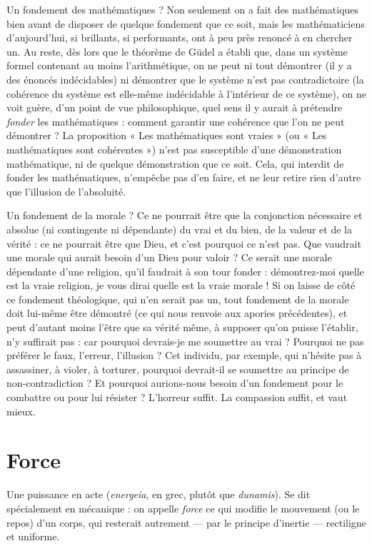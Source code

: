 Un fondement des mathématiques ? Non seulement on a fait des mathématiques
bien avant de disposer de quelque fondement que ce soit, mais les
mathématiciens d’aujourd’hui, si brillants, si performants, ont à peu près
renoncé à en chercher un. Au reste, dès lors que le théorème de Güdel a établi
que, dans un système formel contenant au moins l’arithmétique, on ne peut ni
tout démontrer (il y a des énoncés indécidables) ni démontrer que le système
n’est pas contradictoire (la cohérence du système est elle-même indécidable à
l'intérieur de ce système), on ne voit guère, d’un point de vue philosophique,
quel sens il y aurait à prétendre {\it fonder} les mathématiques : comment garantir
une cohérence que l’on ne peut démontrer ? La proposition « Les mathématiques
sont vraies » (ou « Les mathématiques sont cohérentes ») n’est pas susceptible
d’une démonstration mathématique, ni de quelque démonstration que
ce soit. Cela, qui interdit de fonder les mathématiques, n’empêche pas d’en
faire, et ne leur retire rien d’autre que l'illusion de l’absoluité.

Un fondement de la morale ? Ce ne pourrait être que la conjonction nécessaire
et absolue (ni contingente ni dépendante) du vrai et du bien, de la valeur
et de la vérité : ce ne pourrait être que Dieu, et c’est pourquoi ce n’est pas. Que
vaudrait une morale qui aurait besoin d’un Dieu pour valoir ? Ce serait une
morale dépendante d’une religion, qu’il faudrait à son tour fonder : démontrez-moi
quelle est la vraie religion, je vous dirai quelle est la vraie morale ! Si on
laisse de côté ce fondement théologique, qui n’en serait pas un, tout fondement
de la morale doit lui-même être démontré (ce qui nous renvoie aux apories précédentes),
et peut d’autant moins l’être que sa vérité même, à supposer qu’on
puisse l’établir, n’y suffirait pas : car pourquoi devrais-je me soumettre au vrai ?
Pourquoi ne pas préférer le faux, l'erreur, l'illusion ? Cet individu, par exemple,
qui n’hésite pas à assassiner, à violer, à torturer, pourquoi devrait-il se soumettre
au principe de non-contradiction ? Et pourquoi aurions-nous besoin
d’un fondement pour le combattre ou pour lui résister ? L’horreur suffit. La
compassion suffit, et vaut mieux.

\section{Force}
Une puissance en acte ({\it energeia}, en grec, plutôt que {\it dunamis}). Se
dit spécialement en mécanique : on appelle {\it force} ce qui modifie le
mouvement (ou le repos) d’un corps, qui resterait autrement — par le principe
d’inertie — rectiligne et uniforme.


